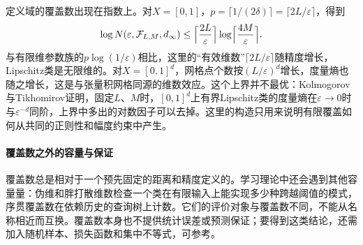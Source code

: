 定义域的覆盖数出现在指数上。对$X=[0,1]$，$p=\lceil1/(2\delta)\rceil=\lceil2L/\varepsilon\rceil$，得到
\[
  \log N(\varepsilon,\mathcal F_{L,M},d_\infty)\le\Bigl\lceil\frac{2L}\varepsilon\Bigr\rceil\log\Bigl\lceil\frac{4M}\varepsilon\Bigr\rceil .
\]
与有限维参数族的$p\log(1/\varepsilon)$相比，这里的“有效维数”$\lceil2L/\varepsilon\rceil$随精度增长，Lipschitz类是无限维的。对$X=[0,1]^d$，网格点个数按$(L/\varepsilon)^d$增长，度量熵也随之增长，这是与张量积网格同源的维数效应。这个上界并不最优：Kolmogorov与Tikhomirov证明，固定$L$、$M$时，$[0,1]^d$上有界Lipschitz类的度量熵在$\varepsilon\to0$时与$\varepsilon^{-d}$同阶，上界中多出的对数因子可以去掉。这里的构造只用来说明有限覆盖如何从共同的正则性和幅度约束中产生。

\paragraph{覆盖数之外的容量与保证}

覆盖数总是相对于一个预先固定的距离和精度定义的。学习理论中还会遇到其他容量量：伪维和胖打散维数检查一个类在有限输入上能实现多少种跨越阈值的模式，序贯覆盖数在依赖历史的查询树上计数。它们的评价对象与覆盖数不同，不能从名称相近而互换。覆盖数本身也不提供统计误差或预测保证；要得到这类结论，还需加入随机样本、损失函数和集中不等式，可参考。
